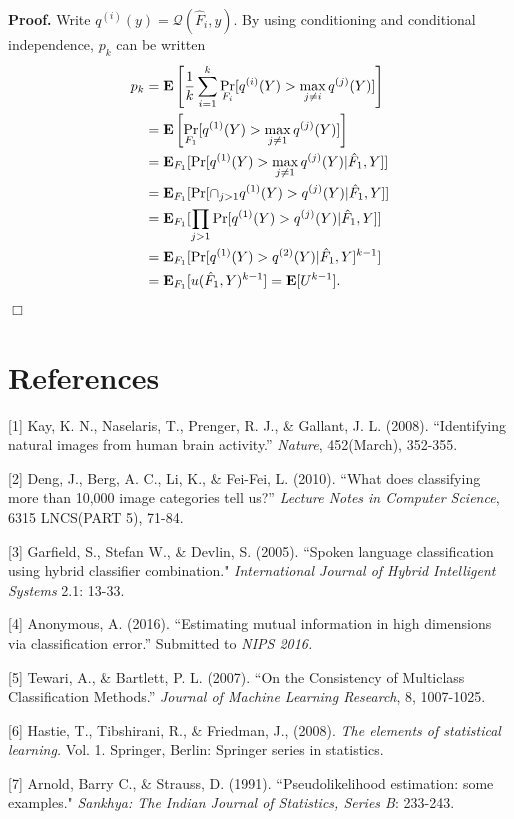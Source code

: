 \documentclass[12pt]{article}
\begin{document}
\noindent\textbf{Proof.}  
Write $q^{(i)}(y) = \mathcal{Q}(\hat{F}_i, y)$.
By using conditioning and
conditional independence, $p_k$ can be written
\begin{align*}
p_k &= \textbf{E}\left[ \frac{1}{k}\sum_{i=1}^k  \Pr_{F_i}[q^{(i)}(Y) > \max_{j\neq i} q^{(j)}(Y)] \right]
\\&= \textbf{E}\left[ \Pr_{F_1}[q^{(1)}(Y) > \max_{j\neq 1} q^{(j)}(Y)] \right]
\\&= \textbf{E}_{F_1}[\Pr[q^{(1)}(Y) > \max_{j\neq 1} q^{(j)}(Y)|\hat{F}_1, Y]]
\\&= \textbf{E}_{F_1}[\Pr[\cap_{j > 1} q^{(1)}(Y) > q^{(j)}(Y)|\hat{F}_1, Y]]
\\&= \textbf{E}_{F_1}[\prod_{j > 1}\Pr[q^{(1)}(Y) > q^{(j)}(Y)|\hat{F}_1, Y]]
\\&= \textbf{E}_{F_1}[\Pr[q^{(1)}(Y) > q^{(2)}(Y)|\hat{F}_1, Y]^{k-1}]
\\&= \textbf{E}_{F_1}[u(\hat{F}_1, Y)^{k-1}] = \textbf{E}[U^{k-1}].
\end{align*}
$\Box$


\section*{References}

\small

[1] Kay, K. N., Naselaris, T., Prenger, R. J., \& Gallant, J. L. (2008). ``Identifying natural images from human brain activity.'' 
\emph{Nature}, 452(March), 352-355.

[2] Deng, J., Berg, A. C., Li, K., \& Fei-Fei, L. (2010). ``What does classifying more than 10,000 image categories tell us?'' \emph{Lecture Notes in Computer Science}, 6315 LNCS(PART 5), 71-84. 

[3] Garfield, S., Stefan W., \& Devlin, S. (2005). ``Spoken language classification using hybrid classifier combination." 
\emph{International Journal of Hybrid Intelligent Systems} 2.1: 13-33.

[4] Anonymous, A. (2016). ``Estimating mutual information in high dimensions via classification error.''  Submitted to 
\emph{NIPS 2016.}

[5] Tewari, A., \& Bartlett, P. L. (2007). ``On the Consistency of Multiclass Classification Methods.''
\emph{Journal of Machine Learning Research}, 8, 1007-1025.

[6] Hastie, T., Tibshirani, R., \& Friedman, J., (2008). \emph{The elements
of statistical learning.} Vol. 1. Springer, Berlin: Springer series in
statistics.

[7] Arnold, Barry C., \& Strauss, D.  (1991). ``Pseudolikelihood estimation: some examples." \emph{Sankhya: The Indian Journal of Statistics, Series B}: 233-243.
\end{document}
